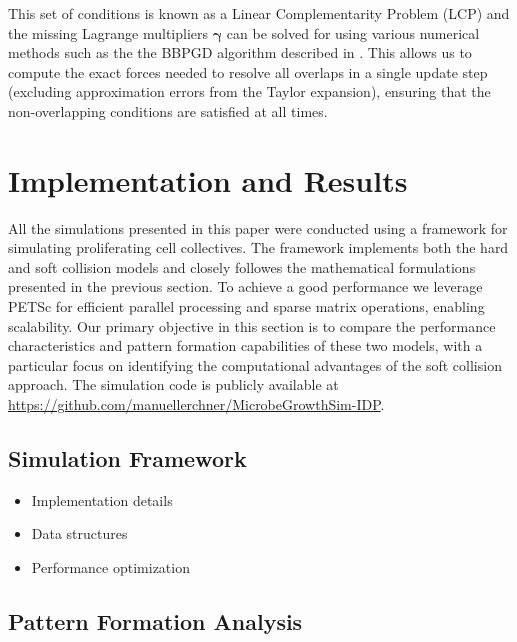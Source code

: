 \documentclass[conference]{IEEEtran}
\begin{document}
This set of conditions is known as a Linear Complementarity Problem (LCP) and the missing Lagrange multipliers $\mathbf{\gamma}$ can be solved for using various numerical methods such as the the BBPGD algorithm described in \cite{Weady2024}. This allows us to compute the exact forces needed to resolve all overlaps in a single update step (excluding approximation errors from the Taylor expansion), ensuring that the non-overlapping conditions are satisfied at all times.




\newpage

\section{Implementation and Results}

All the simulations presented in this paper were conducted using a framework for simulating proliferating cell collectives. The framework implements both the hard and soft collision models and closely followes the mathematical formulations presented in the previous section. To achieve a good performance we leverage PETSc \cite{petsc-web-page} for efficient parallel processing and sparse matrix operations, enabling scalability. Our primary objective in this section is to compare the performance characteristics and pattern formation capabilities of these two models, with a particular focus on identifying the computational advantages of the soft collision approach. The simulation code is publicly available at \url{https://github.com/manuellerchner/MicrobeGrowthSim-IDP}.










\subsection{Simulation Framework}
\begin{itemize}
    \item Implementation details
    \item Data structures
    \item Performance optimization
\end{itemize}

\newpage

\subsection{Pattern Formation Analysis}
\end{document}
